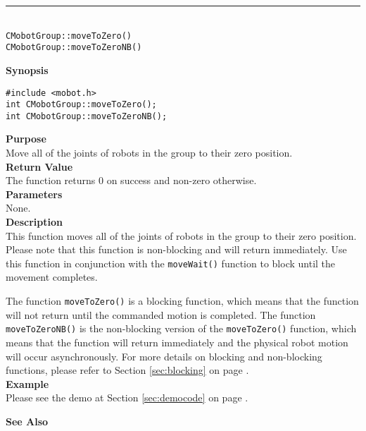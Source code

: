 \noindent
\vspace{5pt}
\rule{4.5in}{0.015in}\\
\noindent
{\LARGE \texttt{CMobotGroup::moveToZero()}}\\
{\LARGE \texttt{CMobotGroup::moveToZeroNB()}}\\
{}

\noindent
{\bf Synopsis}\\
\begin{verbatim}
#include <mobot.h>
int CMobotGroup::moveToZero();
int CMobotGroup::moveToZeroNB();
\end{verbatim}

\noindent
{\bf Purpose}\\
Move all of the joints of robots in the group to their zero position.\\

\noindent
{\bf Return Value}\\
The function returns 0 on success and non-zero otherwise.\\

\noindent
{\bf Parameters}\\
None.\\

\noindent
{\bf Description}\\
This function moves all of the joints of robots in the group to their zero position.
Please note that this function is non-blocking and will return immediately. Use
this function in conjunction with the \texttt{moveWait()} function to block
until the movement completes.

The function \texttt{moveToZero()} is a blocking function, which means that 
the function will not return until the commanded motion is 
completed. The function \texttt{moveToZeroNB()} is the non-blocking version of
the \texttt{moveToZero()} function, which means that the function will return
immediately and the physical robot motion will occur asynchronously. For
more details on blocking and non-blocking functions, please refer to 
Section \ref{sec:blocking} on page \pageref{sec:blocking}.\\

\noindent
{\bf Example}\\
Please see the demo at Section \ref{sec:democode} on page \pageref{sec:democode}.\\
\noindent

\noindent
{\bf See Also}\\

